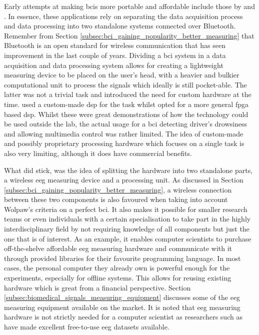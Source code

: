 Early attempts at making \glspl{bci} more portable and affordable include those by \citet{early_bci_drowsiness} and \citet{early_bci_multimedia}.
In essence, these applications rely on separating the data acquisition process and data processing into two standalone systems connected over Bluetooth.
Remember from Section \ref{subsec:bci_gaining_popularity_better_measuring} that Bluetooth is an open standard for wireless communication that has seen improvement in the last couple of years.
Dividing a \gls{bci} system in a data acquisition and data processing system allows for creating a lightweight measuring device to be placed on the user's head, with a heavier and bulkier computational unit to process the signals which ideally is still pocket-able.
The latter was not a trivial task and introduced the need for custom hardware at the time.
\citet{early_bci_drowsiness} used a custom-made \gls{dsp} for the task whilst \citet{early_bci_multimedia} opted for a more general \gls{fpga} based \gls{dsp}.
Whilst these were great demonstrations of how the technology could be used outside the lab, the actual usage for a bci detecting driver's drowsiness \citep[as proposed in the paper by][]{early_bci_drowsiness} and allowing multimedia control \citep[as proposed in the paper by][]{early_bci_multimedia} was rather limited.
The idea of custom-made and possibly proprietary processing hardware which focuses on a single task is also very limiting, although it does have commercial benefits.

What did stick, was the idea of splitting the hardware into two standalone parts, a wireless \gls{eeg} measuring device and a processing unit.
As discussed in Section \ref{subsec:bci_gaining_popularity_better_measuring}, a wireless connection between these two components is also favoured when taking into account Wolpaw's criteria on a perfect \gls{bci}.
It also makes it possible for smaller research teams or even individuals with a certain specialisation to take part in the highly interdisciplinary field by not requiring knowledge of all components but just the one that is of interest.
As an example, it enables computer scientists to purchase off-the-shelve affordable \gls{eeg} measuring hardware and communicate with it through provided libraries for their favourite programming language.
In most cases, the personal computer they already own is powerful enough for the experiments, especially for offline systems.
This allows for reusing existing hardware which is great from a financial perspective.
Section \ref{subsec:biomedical_signals_measuring_equipment} discusses some of the \gls{eeg} measuring equipment available on the market.
It is noted that \gls{eeg} measuring hardware is not strictly needed for a computer scientist as researchers such as \citet{eeg_data} have made excellent free-to-use \gls{eeg} datasets available.

